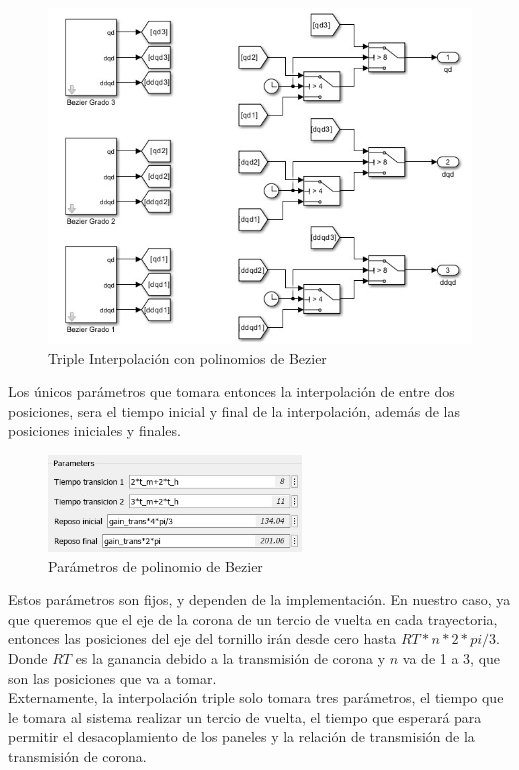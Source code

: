 \begin{figure}[!htb]
    \centering
    \includegraphics[width=1\textwidth]{imagenes/TripleInterpolationBezier.jpg}
    \caption{\footnotesize Triple Interpolación con polinomios de Bezier}
    \label{fig:TripleInterpolationBezier}
\end{figure}
\FloatBarrier
Los únicos parámetros que tomara entonces la interpolación de entre dos posiciones, sera el tiempo inicial y final de la interpolación, además de las posiciones iniciales y finales.
\begin{figure}[!htb]
    \centering
    \includegraphics[width=0.6\textwidth]{imagenes/ParamsBezier.jpg}
    \caption{\footnotesize Parámetros de polinomio de Bezier}
    \label{fig:BezierParams}
\end{figure}
\FloatBarrier
Estos parámetros son fijos, y dependen de la implementación. En nuestro caso, ya que queremos que el eje de la corona de un tercio de vuelta en cada trayectoria, entonces las posiciones del eje del tornillo irán desde cero hasta $RT*n*2*pi/3$. Donde $RT$ es la ganancia debido a la transmisión de corona y $n$ va de 1 a 3, que son las posiciones que va a tomar. \\
Externamente, la interpolación triple solo tomara tres parámetros, el tiempo que le tomara al sistema realizar un tercio de vuelta, el tiempo que esperará para permitir el desacoplamiento de los paneles y la relación de transmisión de la transmisión de corona. \\
